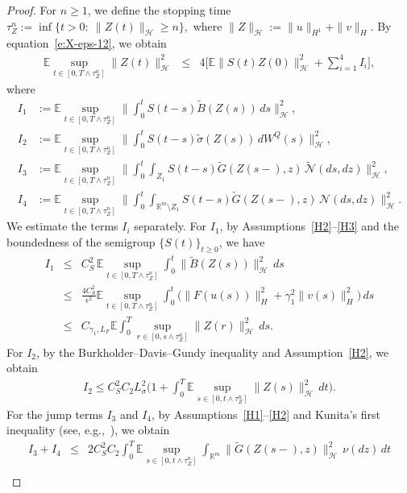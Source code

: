 \documentclass[11pt]{article}
\theoremstyle{plain}
\numberwithin{equation}{section}
\begin{document}
\begin{proof}
For $n\ge1$, we define the stopping time \(\tau_Z^n:=\inf\big\{t>0:\ \|Z(t)\|_{\mathcal H}\ge n\big\},\)
where $\|Z\|_{\mathcal H}:=\|u\|_{H^1}+\|v\|_H$. By equation~\eqref{e:X-eps-12}, we obtain
\begin{eqnarray}\label{well-2}
\mathbb E\sup_{t\in[0,T\wedge\tau_Z^n]}\|Z(t)\|_{\mathcal H}^2
&\le& 4\Bigg[\mathbb E\|S(t)Z(0)\|_{\mathcal H}^2+ \sum_{i=1}^4 I_i\Bigg],
\end{eqnarray}
where
\begin{align*}
I_1 &:= \mathbb E\sup_{t\in[0,T\wedge\tau_Z^n]}
\Big\|\int_0^t S(t-s)\tilde B(Z(s))\,ds\Big\|_{\mathcal H}^2,\\
I_2 &:= \mathbb E\sup_{t\in[0,T\wedge\tau_Z^n]}
\Big\|\int_0^t S(t-s)\tilde\sigma(Z(s))\,dW^Q(s)\Big\|_{\mathcal H}^2,\\
I_3 &:= \mathbb E\sup_{t\in[0,T\wedge\tau_Z^n]}
\Big\|\int_0^t\!\!\int_{Z_1}
S(t-s)\tilde G(Z(s-),z)\,\tilde{\mathcal N}(ds,dz)\Big\|_{\mathcal H}^2,\\
I_4 &:= \mathbb E\sup_{t\in[0,T\wedge\tau_Z^n]}
\Big\|\int_0^t\!\!\int_{\mathbb R^m\setminus Z_1}
S(t-s)\tilde G(Z(s-),z)\,\mathcal N(ds,dz)\Big\|_{\mathcal H}^2 .
\end{align*}
We estimate the terms $I_i$ separately.
For $I_1$, by Assumptions~\ref{H2}--\ref{H3} and the boundedness of the semigroup $\{S(t)\}_{t\ge0}$, we have
\begin{eqnarray}\label{well-3}
I_1 &\le&C_S^2\,\mathbb E\sup_{t\in[0,T\wedge\tau_Z^n]}\int_0^t\|\tilde B(Z(s))\|_{\mathcal H}^2\,ds \nonumber\\
&\le&\frac{4C_S^2}{\epsilon^2}\mathbb E\sup_{t\in[0,T\wedge\tau_Z^n]}\int_0^t\big(\|F(u(s))\|_H^2+\gamma_1^2\|v(s)\|_H^2\big)\,ds \nonumber\\
&\le& C_{\gamma_1,L_F}\mathbb E\int_0^T\sup_{r\in[0,s\wedge\tau_Z^n]}\|Z(r)\|_{\mathcal H}^2\,ds .
\end{eqnarray}
For $I_2$, by the Burkholder--Davis--Gundy inequality and Assumption~\ref{H2}, we obtain
\begin{eqnarray}\label{well-4}
I_2 \le C_S^2 C_2 L_\sigma^2\Bigg(1+\int_0^T\mathbb E\sup_{s\in[0,t\wedge\tau_Z^n]}\|Z(s)\|_{\mathcal H}^2\,dt\Bigg).
\end{eqnarray}
For the jump terms $I_3$ and $I_4$, by Assumptions~\ref{H1}--\ref{H2} and Kunita’s first inequality (see, e.g.,~\cite{Applebaum}), we obtain
\begin{eqnarray}\label{well-levy-1}
I_3+I_4&\le& 2C_S^2 C_2\int_0^T\mathbb E\sup_{s\in[0,t\wedge\tau_Z^n]}\int_{\mathbb R^m}\|\tilde G(Z(s-),z)\|_{\mathcal H}^2\,\nu(dz)\,dt\nonumber\\

\end{eqnarray}
\end{proof}
\end{document}
